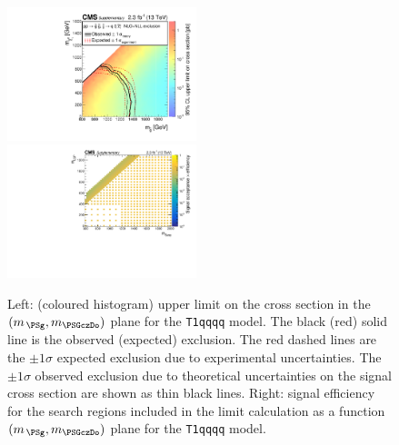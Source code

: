 \clearpage
\begin{figure}[t]
  \begin{center}
    \includegraphics[width=0.49\textwidth]{RA1T1qqqqXSEC_aux} \, 
    \includegraphics[width=0.49\textwidth]{T1qqqq_merging_4_cats_aux} \,     
  \end{center}
  \caption{Left: (coloured histogram) upper limit on the cross section in the $(m_{\,\PSg}, m_{\PSGczDo})$ plane for the \texttt{T1qqqq} model. 
  The black (red) solid line is the observed (expected) exclusion. The red dashed lines are the $\pm1\sigma$ expected exclusion due to experimental uncertainties. 
  The $\pm1\sigma$ observed exclusion due to theoretical uncertainties on the signal cross section are shown as thin black lines. 
  Right: signal efficiency for the search regions included in the limit calculation as a function $(m_{\,\PSg}, m_{\PSGczDo})$ plane for the \texttt{T1qqqq} model. 
  \label{fig:T1qqqq_excl}}
\end{figure}

